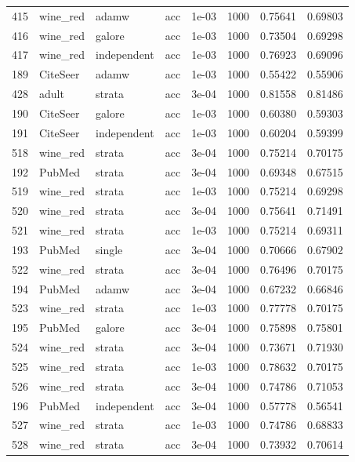 \begin{longtable}{rlllrrrr}
415 & wine\_red & adamw & acc & 1e-03 & 1000 & 0.75641 & 0.69803 \\
416 & wine\_red & galore & acc & 1e-03 & 1000 & 0.73504 & 0.69298 \\
417 & wine\_red & independent & acc & 1e-03 & 1000 & 0.76923 & 0.69096 \\
189 & CiteSeer & adamw & acc & 1e-03 & 1000 & 0.55422 & 0.55906 \\
\rowcolor{oursbg}
428 & adult & strata & acc & 3e-04 & 1000 & 0.81558 & 0.81486 \\
190 & CiteSeer & galore & acc & 1e-03 & 1000 & 0.60380 & 0.59303 \\
191 & CiteSeer & independent & acc & 1e-03 & 1000 & 0.60204 & 0.59399 \\
\rowcolor{oursbg}
518 & wine\_red & strata & acc & 3e-04 & 1000 & 0.75214 & 0.70175 \\
192 & PubMed & strata & acc & 3e-04 & 1000 & 0.69348 & 0.67515 \\
\rowcolor{oursbg}
519 & wine\_red & strata & acc & 1e-03 & 1000 & 0.75214 & 0.69298 \\
520 & wine\_red & strata & acc & 3e-04 & 1000 & 0.75641 & 0.71491 \\
\rowcolor{oursbg}
521 & wine\_red & strata & acc & 1e-03 & 1000 & 0.75214 & 0.69311 \\
193 & PubMed & single & acc & 3e-04 & 1000 & 0.70666 & 0.67902 \\
\rowcolor{oursbg}
522 & wine\_red & strata & acc & 3e-04 & 1000 & 0.76496 & 0.70175 \\
194 & PubMed & adamw & acc & 3e-04 & 1000 & 0.67232 & 0.66846 \\
\rowcolor{oursbg}
523 & wine\_red & strata & acc & 1e-03 & 1000 & 0.77778 & 0.70175 \\
195 & PubMed & galore & acc & 3e-04 & 1000 & 0.75898 & 0.75801 \\
\rowcolor{oursbg}
524 & wine\_red & strata & acc & 3e-04 & 1000 & 0.73671 & 0.71930 \\
525 & wine\_red & strata & acc & 1e-03 & 1000 & 0.78632 & 0.70175 \\
\rowcolor{oursbg}
526 & wine\_red & strata & acc & 3e-04 & 1000 & 0.74786 & 0.71053 \\
196 & PubMed & independent & acc & 3e-04 & 1000 & 0.57778 & 0.56541 \\
\rowcolor{oursbg}
527 & wine\_red & strata & acc & 1e-03 & 1000 & 0.74786 & 0.68833 \\
528 & wine\_red & strata & acc & 3e-04 & 1000 & 0.73932 & 0.70614 \\

\end{longtable}
